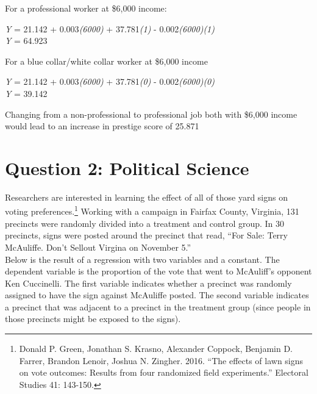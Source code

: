 \documentclass[12pt,letterpaper]{article}
\begin{document}
\begin{enumerate}
	\noindent For a professional worker at \$6,000 income:
	\begin{center}
		\textit{Y} = 21.142 + 0.003\textit{(6000)} + 37.781\textit{(1)} - 0.002\textit{(6000)}\textit{(1)} \\
		\textit{Y} = 64.923
	\end{center}

	\noindent For a blue collar/white collar worker at \$6,000 income
	\begin{center}
		\textit{Y} = 21.142 + 0.003\textit{(6000)} + 37.781\textit{(0)} - 0.002\textit{(6000)}\textit{(0)} \\
		\textit{Y} = 39.142
	\end{center}

	\noindent Changing from a non-professional to professional job both with \$6,000 income would lead to an increase in prestige score of 25.871
	
\end{enumerate}


\newpage

\section*{Question 2: Political Science}
\vspace{.25cm}
\noindent 	Researchers are interested in learning the effect of all of those yard signs on voting preferences.\footnote{Donald P. Green, Jonathan	S. Krasno, Alexander Coppock, Benjamin D. Farrer,	Brandon Lenoir, Joshua N. Zingher. 2016. ``The effects of lawn signs on vote outcomes: Results from four randomized field experiments.'' Electoral Studies 41: 143-150. } Working with a campaign in Fairfax County, Virginia, 131 precincts were randomly divided into a treatment and control group. In 30 precincts, signs were posted around the precinct that read, ``For Sale: Terry McAuliffe. Don't Sellout Virgina on November 5.'' \\

Below is the result of a regression with two variables and a constant.  The dependent variable is the proportion of the vote that went to McAuliff's opponent Ken Cuccinelli. The first variable indicates whether a precinct was randomly assigned to have the sign against McAuliffe posted. The second variable indicates
a precinct that was adjacent to a precinct in the treatment group (since people in those precincts might be exposed to the signs).  \\
\end{document}
